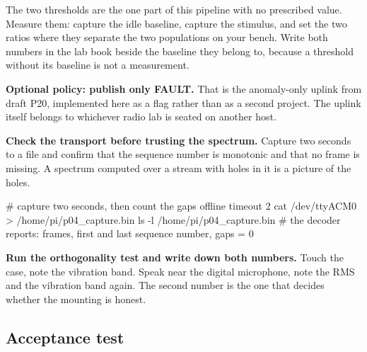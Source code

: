 \begin{steps}
The two thresholds are the one part of this pipeline with no prescribed value. Measure them: capture the idle baseline, capture the stimulus, and set the two ratios where they separate the two populations on your bench. Write both numbers in the lab book beside the baseline they belong to, because a threshold without its baseline is not a measurement.

\item \textbf{Optional policy: publish only FAULT.} That is the anomaly-only uplink from draft P20, implemented here as a flag rather than as a second project. The uplink itself belongs to whichever radio lab is seated on another host.

\item \textbf{Check the transport before trusting the spectrum.} Capture two seconds to a file and confirm that the sequence number is monotonic and that no frame is missing. A spectrum computed over a stream with holes in it is a picture of the holes.
\begin{shellcode}
# capture two seconds, then count the gaps offline
timeout 2 cat /dev/ttyACM0 > /home/pi/p04_capture.bin
ls -l /home/pi/p04_capture.bin
# the decoder reports: frames, first and last sequence number, gaps = 0
\end{shellcode}

\item \textbf{Run the orthogonality test and write down both numbers.} Touch the case, note the vibration band. Speak near the digital microphone, note the RMS and the vibration band again. The second number is the one that decides whether the mounting is honest.
\end{steps}

\subsection*{Acceptance test}

